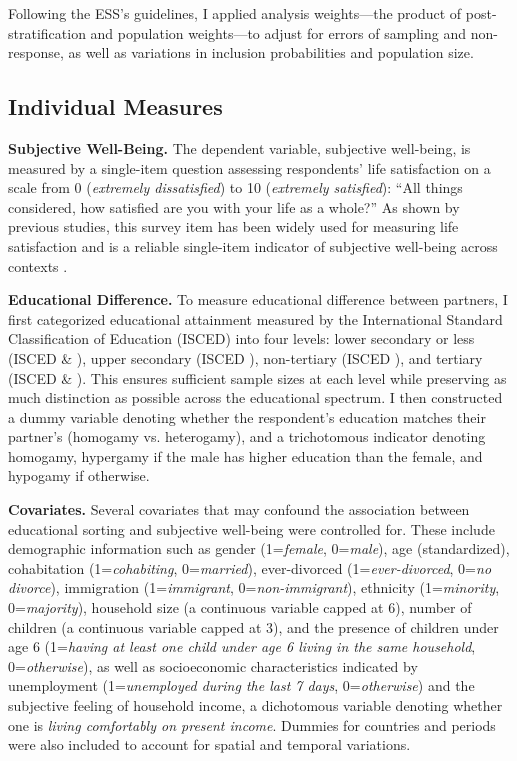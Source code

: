 Following the ESS's guidelines, I applied analysis weights—the product of post-stratification and population weights—to adjust for errors of sampling and non-response, as well as variations in inclusion probabilities and population size.

\subsection{Individual Measures}

\textbf{Subjective Well-Being.} The dependent variable, subjective well-being, is measured by a single-item question assessing respondents' life satisfaction on a scale from 0 (\textit{extremely dissatisfied}) to 10 (\textit{extremely satisfied}): “All things considered, how satisfied are you with your life as a whole?” As shown by previous studies, this survey item has been widely used for measuring life satisfaction and is a reliable single-item indicator of subjective well-being across contexts \parencite{cheungAssessingValiditySingleitem2014,dienerSubjectiveWellBeingScience2009}.

\textbf{Educational Difference.} To measure educational difference between partners, I first categorized educational attainment measured by the International Standard Classification of Education (ISCED) into four levels: lower secondary or less (ISCED  \& ), upper secondary (ISCED ), non-tertiary (ISCED ), and tertiary (ISCED  \& ). This ensures sufficient sample sizes at each level while preserving as much distinction as possible across the educational spectrum. I then constructed a dummy variable denoting whether the respondent's education matches their partner's (homogamy vs. heterogamy), and a trichotomous indicator denoting homogamy, hypergamy if the male has higher education than the female, and hypogamy if otherwise.

\textbf{Covariates.} Several covariates that may confound the association between educational sorting and subjective well-being were controlled for. These include demographic information such as gender (1=\textit{female}, 0=\textit{male}), age (standardized), cohabitation (1=\textit{cohabiting}, 0=\textit{married}), ever-divorced (1=\textit{ever-divorced}, 0=\textit{no divorce}), immigration (1=\textit{immigrant}, 0=\textit{non-immigrant}), ethnicity (1=\textit{minority}, 0=\textit{majority}), household size (a continuous variable capped at 6), number of children (a continuous variable capped at 3), and the presence of children under age 6 (1=\textit{having at least one child under age 6 living in the same household}, 0=\textit{otherwise}), as well as socioeconomic characteristics indicated by unemployment (1=\textit{unemployed during the last 7 days}, 0=\textit{otherwise}) and the subjective feeling of household income, a dichotomous variable denoting whether one is \textit{living comfortably on present income}. Dummies for countries and periods were also included to account for spatial and temporal variations.

